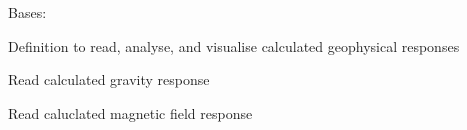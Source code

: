 \documentclass[a4paper,10pt,english]{sphinxmanual}
\begin{document}
\begin{fulllineitems}
\label{pynoddy:pynoddy.output.NoddyGeophysics}
Bases: 

Definition to read, analyse, and visualise calculated geophysical responses

\begin{fulllineitems}
\label{pynoddy:pynoddy.output.NoddyGeophysics.read_gravity}
Read calculated gravity response

\end{fulllineitems}


\begin{fulllineitems}
\label{pynoddy:pynoddy.output.NoddyGeophysics.read_magnetics}
Read caluclated magnetic field response

\end{fulllineitems}


\end{fulllineitems}

\end{document}
